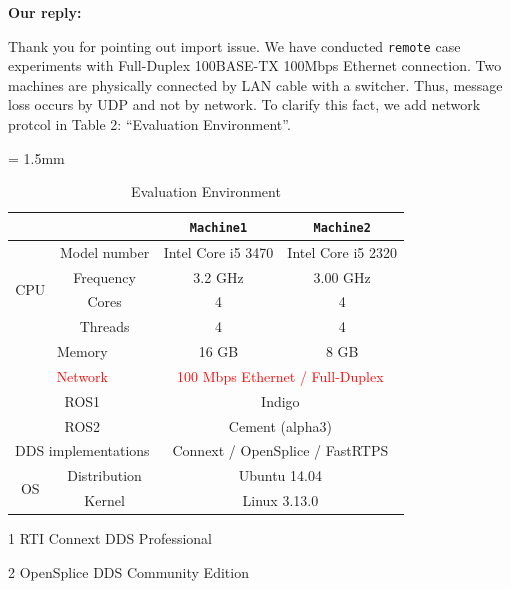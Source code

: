 \documentclass{article}
\begin{document}
\begin{enumerate}
  \begin{flushleft}
    \textbf{Our reply:}
  \end{flushleft}
  Thank you for pointing out import issue. 
  We have conducted \texttt{remote} case experiments with Full-Duplex 100BASE-TX 100Mbps Ethernet connection.
  Two machines are physically connected by LAN cable with a switcher.
  Thus, message loss occurs by UDP and not by network.
  To clarify this fact, we add network protcol in Table 2: ``Evaluation Environment''.
  \setcounter{table}{1}
  \begin{table}[htb]
    \caption{Evaluation Environment} 
    \centering
    \begin{threeparttable}
      \renewcommand{\arraystretch}{1.0}
      \label{tb:environment}
      \small
      \tabcolsep = 1.5mm              %
      \begin{tabular}{c|c||c|c}
        \hline
        \multicolumn{2}{c||}{ } & \textbf{\texttt{Machine1}} & \textbf{\texttt{Machine2}} \\ \hline \hline
        \multirow{4}{*}{CPU}   & Model number & Intel Core i5 3470 & Intel Core i5 2320 \\ 
        & Frequency & 3.2 GHz & 3.00 GHz \\ 
        & Cores & 4 & 4 \\ 
        & Threads & 4 & 4 \\ \hline
        \multicolumn{2}{c||}{Memory} & 16 GB & 8 GB \\ \hline 
        \multicolumn{2}{c||}{\textcolor{red}{Network}} & \multicolumn{2}{c}{\textcolor{red}{100 Mbps Ethernet / Full-Duplex}} \\ \hline
        \multicolumn{2}{c||}{ROS1} & \multicolumn{2}{c}{Indigo} \\ 
        \multicolumn{2}{c||}{ROS2} & \multicolumn{2}{c}{Cement (alpha3)} \\ 
        \multicolumn{2}{c||}{DDS implementations} & \multicolumn{2}{c}{Connext\tnote{1} / OpenSplice\tnote{2} / FastRTPS } \\ \hline 
        \multirow{2}{*}{OS} & Distribution & \multicolumn{2}{c}{Ubuntu 14.04} \\ 
        & Kernel & \multicolumn{2}{c}{Linux 3.13.0} \\ \hline
      \end{tabular}
      \begin{tablenotes}
      \item[1] RTI Connext DDS Professional \cite{rti_connext}
      \item[2] OpenSplice DDS Community Edition \cite{ospl_dds_community}
      \end{tablenotes}
    \end{threeparttable}
  \end{table}
  

\end{enumerate}
\end{document}
